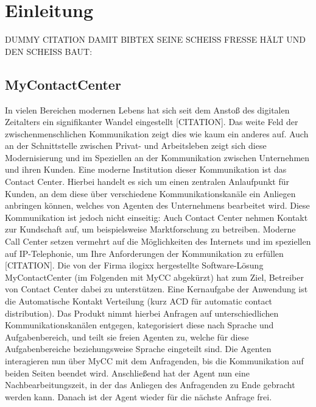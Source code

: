 \chapter{Einleitung}
\label{chap:Einleitung}

DUMMY CITATION DAMIT BIBTEX SEINE SCHEISS FRESSE HÄLT UND DEN SCHEISS BAUT: \cite{Coloouris:02}

\section{MyContactCenter}
In vielen Bereichen modernen Lebens hat sich seit dem Anstoß des digitalen Zeitalters ein signifikanter Wandel eingestellt [CITATION]. Das weite Feld  der zwischenmenschlichen Kommunikation zeigt dies wie kaum ein anderes auf. Auch an der Schnittstelle zwischen Privat- und Arbeitsleben zeigt sich diese Modernisierung und im Speziellen an der Kommunikation zwischen Unternehmen und ihren Kunden. Eine moderne Institution dieser Kommunikation ist das Contact Center. Hierbei handelt es sich um einen zentralen Anlaufpunkt für Kunden, an dem diese über verschiedene Kommunikationskanäle ein Anliegen anbringen können, welches von Agenten des Unternehmens bearbeitet wird. Diese Kommunikation ist jedoch nicht einseitig: Auch Contact Center nehmen Kontakt zur Kundschaft auf, um beispielsweise Marktforschung zu betreiben. 
\newline
Moderne Call Center setzen vermehrt auf die Möglichkeiten des Internets und im speziellen auf IP-Telephonie, um Ihre Anforderungen der Kommunikation zu erfüllen [CITATION]. Die von der Firma ilogixx hergestellte Software-Lösung MyContactCenter (im Folgenden mit MyCC abgekürzt) hat zum Ziel, Betreiber von Contact Center dabei zu unterstützen. Eine Kernaufgabe der Anwendung ist die Automatische Kontakt Verteilung (kurz ACD für automatic contact distribution). Das Produkt nimmt hierbei Anfragen auf unterschiedlichen Kommunikationskanälen entgegen, kategorisiert diese nach Sprache und Aufgabenbereich, und teilt sie freien Agenten zu, welche für diese Aufgabenbereiche beziehungsweise Sprache eingeteilt sind. Die Agenten interagieren nun über MyCC mit dem Anfragenden, bis die Kommunikation auf beiden Seiten beendet wird. Anschließend hat der Agent nun eine Nachbearbeitungszeit, in der das Anliegen des Anfragenden zu Ende gebracht werden kann. Danach ist der Agent wieder für die nächste Anfrage frei.
\newline
